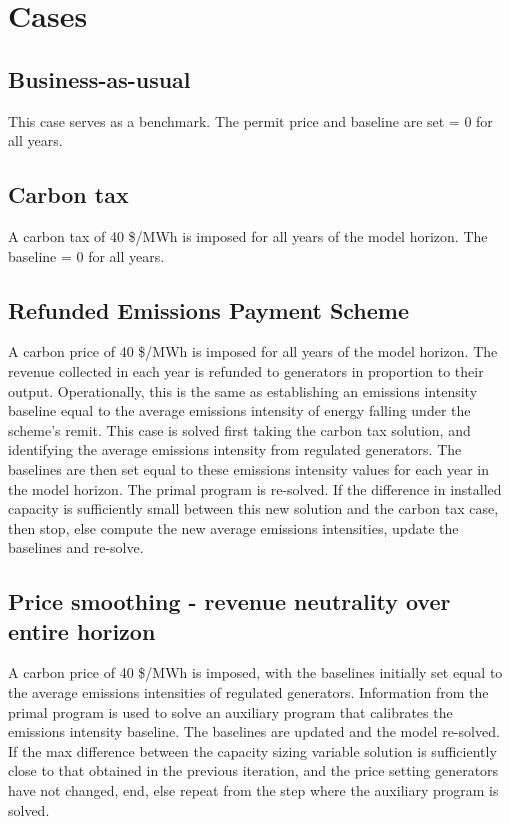 \documentclass{article}
\begin{document}
\section{Cases}
\subsection{Business-as-usual}
This case serves as a benchmark. The permit price and baseline are set = 0 for all years.

\subsection{Carbon tax}
A carbon tax of 40 \$/MWh is imposed for all years of the model horizon. The baseline = 0 for all years.

\subsection{Refunded Emissions Payment Scheme}
A carbon price of 40 \$/MWh is imposed for all years of the model horizon. The revenue collected in each year is refunded to generators in proportion to their output. Operationally, this is the same as establishing an emissions intensity baseline equal to the average emissions intensity of energy falling under the scheme's remit. This case is solved first taking the carbon tax solution, and identifying the average emissions intensity from regulated generators. The baselines are then set equal to these emissions intensity values for each year in the model horizon. The primal program is re-solved. If the difference in installed capacity is sufficiently small between this new solution and the carbon tax case, then stop, else compute the new average emissions intensities, update the baselines and re-solve.

\subsection{Price smoothing - revenue neutrality over entire horizon}
A carbon price of 40 \$/MWh is imposed, with the baselines initially set equal to the average emissions intensities of regulated generators. Information from the primal program is used to solve an auxiliary program that calibrates the emissions intensity baseline. The baselines are updated and the model re-solved. If the max difference between the capacity sizing variable solution is sufficiently close to that obtained in the previous iteration, and the price setting generators have not changed, end, else repeat from the step where the auxiliary program is solved.
\end{document}
